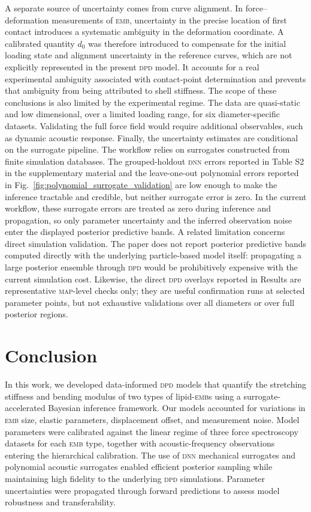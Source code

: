 \documentclass[%
 aip,
 jcp,
 amsmath,amssymb,
 preprint,%
]{revtex4-1}
\begin{document}
A separate source of uncertainty comes from curve alignment. In force--deformation measurements of \textsc{emb}, uncertainty in the precise location of first contact introduces a systematic ambiguity in the deformation coordinate. A calibrated quantity $d_0$ was therefore introduced to compensate for the initial loading state and alignment uncertainty in the reference curves, which are not explicitly represented in the present \textsc{dpd} model. It accounts for a real experimental ambiguity associated with contact-point determination and prevents that ambiguity from being attributed to shell stiffness. The scope of these conclusions is also limited by the experimental regime. The data are quasi-static and low dimensional, over a limited loading range, for six diameter-specific datasets. Validating the full force field would require additional observables, such as dynamic acoustic response. Finally, the uncertainty estimates are conditional on the surrogate pipeline. The workflow relies on surrogates constructed from finite simulation databases. The grouped-holdout \textsc{dnn} errors reported in Table S2 in the supplementary material and the leave-one-out polynomial errors reported in Fig.~\ref{fig:polynomial_surrogate_validation} are low enough to make the inference tractable and credible, but neither surrogate error is zero. In the current workflow, these surrogate errors are treated as zero during inference and propagation, so only parameter uncertainty and the inferred observation noise enter the displayed posterior predictive bands. A related limitation concerns direct simulation validation. The paper does not report posterior predictive bands computed directly with the underlying particle-based model itself: propagating a large posterior ensemble through \textsc{dpd} would be prohibitively expensive with the current simulation cost. Likewise, the direct \textsc{dpd} overlays reported in Results are representative \textsc{map}-level checks only; they are useful confirmation runs at selected parameter points, but not exhaustive validations over all diameters or over full posterior regions.

\section{Conclusion}

In this work, we developed data-informed \textsc{dpd} models that quantify the stretching stiffness and bending modulus of two types of lipid-\textsc{emb}s using a surrogate-accelerated Bayesian inference framework. Our models accounted for variations in \textsc{emb} size, elastic parameters, displacement offset, and measurement noise. Model parameters were calibrated against the linear regime of three force spectroscopy datasets for each \textsc{emb} type, together with acoustic-frequency observations entering the hierarchical calibration. The use of \textsc{dnn} mechanical surrogates and polynomial acoustic surrogates enabled efficient posterior sampling while maintaining high fidelity to the underlying \textsc{dpd} simulations. Parameter uncertainties were propagated through forward predictions to assess model robustness and transferability.
\end{document}
